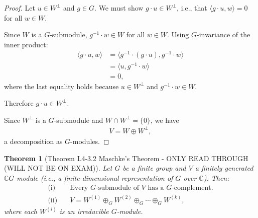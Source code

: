 \documentclass[titlepage]{article}
\theoremstyle{plain}
\newtheorem{theorem}{Theorem}[section]
\theoremstyle{definition}
\theoremstyle{remark}
\theoremstyle{exercise-style}
\numberwithin{equation}{section}
\numberwithin{theorem}{section}
\numberwithin{remark}{section}
\begin{document}
\begin{proof}
    Let $u \in W^\perp$ and $g \in G$. We must show $g \cdot u \in W^\perp$, i.e., that $\langle g \cdot u, w \rangle = 0$ for all $w \in W$.
    
    Since $W$ is a $G$-submodule, $g^{-1} \cdot w \in W$ for all $w \in W$. Using $G$-invariance of the inner product:
    \begin{align}
        \langle g \cdot u, w \rangle &= \langle g^{-1} \cdot (g \cdot u), g^{-1} \cdot w \rangle \\
        &= \langle u, g^{-1} \cdot w \rangle \\
        &= 0,
    \end{align}
    where the last equality holds because $u \in W^\perp$ and $g^{-1} \cdot w \in W$.
    
    Therefore $g \cdot u \in W^\perp$.
    
    Since $W^\perp$ is a $G$-submodule and $W \cap W^\perp = \{0\}$, we have
    \begin{align}
        V = W \oplus W^\perp,
    \end{align}
    a decomposition as $G$-modules.
\end{proof}

\begin{myboxg}
    \begin{theorem}[Theorem L4-3.2 Maschke’s Theorem - ONLY READ THROUGH (WILL NOT BE ON EXAM)]
    Let $G$ be a finite group and $V$ a finitely generated $\mathbb{C}G$-module (i.e., a finite-dimensional representation of $G$ over $\mathbb{C}$). Then:
    \begin{align}
        \text{(i)} \quad & \text{Every $G$-submodule of $V$ has a $G$-complement.} \\
        \text{(ii)} \quad & V = W^{(1)} \oplus_G W^{(2)} \oplus_G \cdots \oplus_G W^{(k)},
    \end{align}
    where each $W^{(i)}$ is an irreducible $G$-module.
    \end{theorem}
\end{myboxg}
\end{document}
